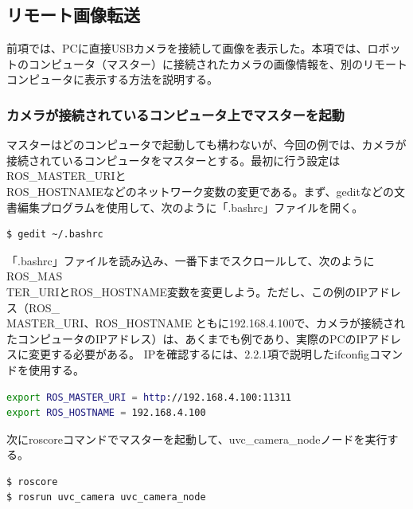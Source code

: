 \subsection{リモート画像転送}

前項では、PCに直接USBカメラを接続して画像を表示した。本項では、ロボットのコンピュータ（マスター）に接続されたカメラの画像情報を、別のリモートコンピュータに表示する方法を説明する。

\subsubsection{カメラが接続されているコンピュータ上でマスターを起動}

マスターはどのコンピュータで起動しても構わないが、今回の例では、カメラが接続されているコンピュータをマスターとする。最初に行う設定はROS\_MASTER\_URIと\\ROS\_HOSTNAMEなどのネットワーク変数の変更である。まず、geditなどの文書編集プログラムを使用して、次のように「.bashrc」ファイルを開く。

\begin{lstlisting}[language=ROS]
$ gedit ~/.bashrc
\end{lstlisting}

「.bashrc」ファイルを読み込み、一番下までスクロールして、次のようにROS\_MAS\\TER\_URIとROS\_HOSTNAME変数を変更しよう。ただし、この例のIPアドレス（ROS\_\\MASTER\_URI、ROS\_HOSTNAME ともに192.168.4.100で、カメラが接続されたコンピュータのIPアドレス）は、あくまでも例であり、実際のPCのIPアドレスに変更する必要がある。 IPを確認するには、2.2.1項で説明したifconfigコマンドを使用する。

\begin{lstlisting}[language=bash]
export ROS_MASTER_URI = http://192.168.4.100:11311
export ROS_HOSTNAME = 192.168.4.100
\end{lstlisting}

次にroscoreコマンドでマスターを起動して、uvc\_camera\_nodeノードを実行する。

\begin{lstlisting}[language=ROS]
$ roscore
$ rosrun uvc_camera uvc_camera_node
\end{lstlisting}

